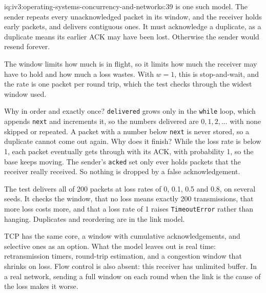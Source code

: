 \begin{solution}{iq:iv3:operating-systems-concurrency-and-networks:39}
 is one such model. The sender repeats every unacknowledged packet in its window, and the receiver holds early packets, and delivers contiguous ones. It must acknowledge a duplicate, as a duplicate means its earlier ACK may have been lost. Otherwise the sender would resend forever.
\label{lst:iv3:os:reliable}

The window limits how much is in flight, so it limits how much the receiver may have to hold and how much a loss wastes. With $w = 1$, this is stop-and-wait, and the rate is one packet per round trip, which the test checks through the widest window used.

Why in order and exactly once? \texttt{delivered} grows only in the \texttt{while} loop, which appends \texttt{next} and increments it, so the numbers delivered are $0, 1, 2, \dots$ with none skipped or repeated. A packet with a number below \texttt{next} is never stored, so a duplicate cannot come out again. Why does it finish? While the loss rate is below 1, each packet eventually gets through with its ACK, with probability 1, so the base keeps moving. The sender's \texttt{acked} set only ever holds packets that the receiver really received. So nothing is dropped by a false acknowledgement.

The test delivers all of 200 packets at loss rates of 0, 0.1, 0.5 and 0.8, on several seeds. It checks the window, that no loss means exactly 200 transmissions, that more loss costs more, and that a loss rate of 1 raises \texttt{TimeoutError} rather than hanging. Duplicates and reordering are in the link model.

TCP has the same core, a window with cumulative acknowledgements, and selective ones as an option. What the model leaves out is real time: retransmission timers, round-trip estimation, and a congestion window that shrinks on loss. Flow control is also absent: this receiver has unlimited buffer. In a real network, sending a full window on each round when the link is the cause of the loss makes it worse.

\end{solution}

